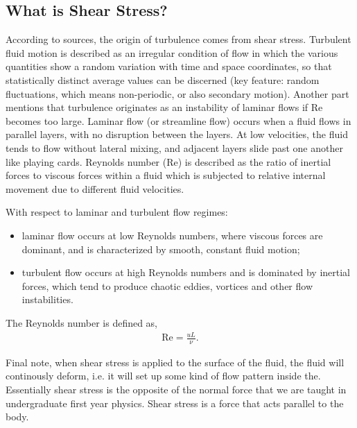 \subsection{What is Shear Stress?}
According to sources, the origin of turbulence comes from shear stress. Turbulent fluid motion is described as an irregular condition of flow in which the various quantities show a random variation with time and space coordinates, so that statistically distinct average values can be discerned (key feature: random fluctuations, which means non-periodic, or also secondary motion). Another part mentions that turbulence originates as an instability of laminar flows if Re becomes too large. Laminar flow (or streamline flow) occurs when a fluid flows in parallel layers, with no disruption between the layers. At low velocities, the fluid tends to flow without lateral mixing, and adjacent layers slide past one another like playing cards. Reynolds number (Re) is described as the ratio of inertial forces to viscous forces within a fluid which is subjected to relative internal movement due to different fluid velocities. 

\shear

With respect to laminar and turbulent flow regimes:
\begin{itemize}
	\item laminar flow occurs at low Reynolds numbers, where viscous forces are dominant, and is characterized by smooth, constant fluid motion;
	\item turbulent flow occurs at high Reynolds numbers and is dominated by inertial forces, which tend to produce chaotic eddies, vortices and other flow instabilities.
\end{itemize} 

The Reynolds number is defined as, 
\begin{align}
	\text{Re} = \frac{u L}{\nu}.
\end{align}

Final note, when shear stress is applied to the surface of the fluid, the fluid will continously deform, i.e. it will set up some kind of flow pattern inside the. Essentially shear stress is the opposite of the normal force that we are taught in undergraduate first year physics. Shear stress is a force that acts parallel to the body.
 
